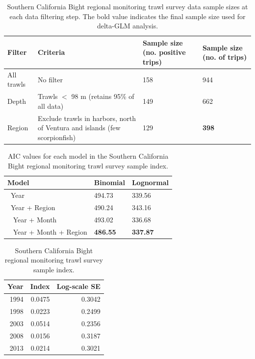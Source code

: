 \documentclass[12pt,]{article}
\begin{document}
\begin{table}[ht]
\centering
\caption{Southern California Bight regional 
                                          monitoring trawl survey data sample 
                                          sizes at each data filtering step.  
                                          The bold value indicates the final sample size 
                                          used for delta-GLM analysis.} 
\label{tab:Fleet11_SCBSurvey_filter}
\begin{tabular}{>{\raggedright}p{1.5in}>{\raggedright}p{2.6in}>{\raggedright}p{1in}>{\raggedright}p{1in}}
  \hline
Filter & Criteria & Sample size (no. positive trips) & Sample size (no. of trips) \\ 
  \hline
All trawls & No filter & 158 & 944 \\ 
  Depth & Trawls $<$ 98 m (retains 95\% of all data) & 149 & 662 \\ 
  Region & Exclude trawls in harbors, north of Ventura and islands (few scorpionfish) & 129 & \textbf{398} \\ 
   \hline
\end{tabular}
\end{table}\begin{table}[ht]
\centering
\caption{AIC values for each model in the
                                          Southern California Bight regional 
                                          monitoring trawl survey sample 
                                          index.} 
\label{tab:Fleet11_SCBSurvey_aic}
\begin{tabular}{lll}
  \hline
Model & Binomial & Lognormal \\ 
  \hline
~Year & 494.73 & 339.56 \\ 
  ~Year + Region & 490.24 & 343.16 \\ 
  ~ Year + Month & 493.02 & 336.68 \\ 
  ~ Year + Month + Region & \textbf{486.55} & \textbf{337.87} \\ 
   \hline
\end{tabular}
\end{table}\begin{table}[ht]
\centering
\caption{Southern California Bight regional 
                                          monitoring trawl survey sample index.} 
\label{tab:Fleet11_SCBSurvey_index}
\begin{tabular}{rrr}
  \hline
Year & Index & Log-scale SE \\ 
  \hline
 1994 & 0.0475 & 0.3042 \\ 
   1998 & 0.0223 & 0.2499 \\ 
   2003 & 0.0514 & 0.2356 \\ 
   2008 & 0.0156 & 0.3187 \\ 
   2013 & 0.0214 & 0.3021 \\ 
   \hline
\end{tabular}
\end{table}
\end{document}
